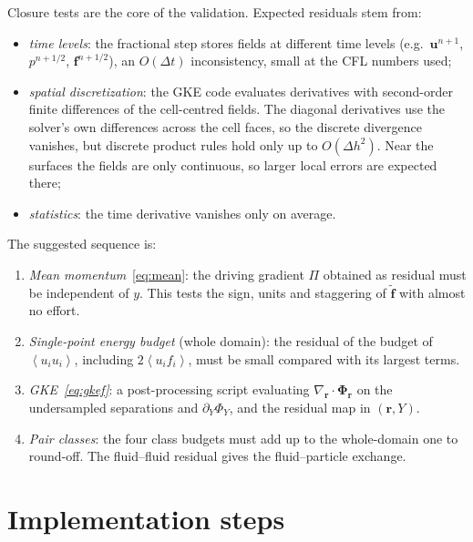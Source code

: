 \documentclass[11pt,a4paper]{article}
\newcommand{\avg}[1]{\left\langle #1 \right\rangle}
\newcommand{\vect}[1]{\boldsymbol{#1}}
\begin{document}
Closure tests are the core of the validation. Expected residuals stem from:
\begin{itemize}[itemsep=1pt]
\item \emph{time levels}: the fractional step stores fields at different time
  levels (e.g.\ $\vect u^{n+1}$, $p^{n+1/2}$, $\vect f^{n+1/2}$), an
  $O(\Delta t)$ inconsistency, small at the CFL numbers used;
\item \emph{spatial discretization}: the GKE code evaluates derivatives with
  second-order finite differences of the cell-centred fields. The diagonal
  derivatives use the solver's own differences across the cell faces, so the
  discrete divergence vanishes, but discrete product rules hold only up to
  $O(\Delta h^2)$. Near the surfaces the fields are only continuous, so
  larger local errors are expected there;
\item \emph{statistics}: the time derivative vanishes only on average.
\end{itemize}
The suggested sequence is:
\begin{enumerate}[itemsep=1pt]
\item \emph{Mean momentum}~\eqref{eq:mean}: the driving gradient $\Pi$
  obtained as residual must be independent of $y$. This tests the sign,
  units and staggering of $\tilde{\vect f}$ with almost no effort.
\item \emph{Single-point energy budget} (whole domain): the residual of the
  budget of $\avg{u_iu_i}$, including $2\avg{u_if_i}$, must be small compared
  with its largest terms.
\item \emph{GKE~\eqref{eq:gkef}}: a post-processing script evaluating
  $\nabla_{\vect r}\cdot\vect\Phi_{\vect r}$ on the undersampled separations
  and $\partial_Y\Phi_Y$, and the residual map in $(\vect r,Y)$.
\item \emph{Pair classes}: the four class budgets must add up to the
  whole-domain one to round-off. The fluid--fluid residual gives the
  fluid--particle exchange.
\end{enumerate}

\section{Implementation steps}
\end{document}
